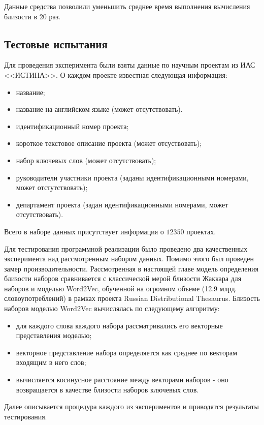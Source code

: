 Данные средства позволили уменьшить среднее время выполнения вычисления близости в 20 раз.

\subsection{Тестовые испытания}
Для проведения эксперимента были взяты данные по научным проектам из ИАС <<ИСТИНА>>. О каждом проекте известная следующая информация: 
\begin{itemize}
    \item название;
    \item название на английском языке (может отсутствовать).
    \item идентификационный номер проекта;
    \item короткое текстовое описание проекта (может отсуствовать);
    \item набор ключевых слов (может отсутствовать);
    \item руководители участники проекта (заданы идентификационными номерами, может отстутствовать);
    \item департамент проекта (задан идентификационными номерами, может отсутствовать).
\end{itemize}

Всего в наборе данных присутствует информация о $12350$ проектах. 

Для тестирования программной реализации было проведено два качественных эксперимента над рассмотренным набором данных. Помимо этого был проведен замер производительности. Рассмотренная в настоящей главе модель определения близости наборов сравнивается с классической мерой близости Жаккара для наборов и моделью Word2Vec, обученной на огромном объеме (12.9 млрд. словоупотреблений) в рамках проекта Russian Distributional Thesaurus. Близость наборов моделью Word2Vec вычислялась по следующему алгоритму:
\begin{itemize}
    \item для каждого слова каждого набора рассматривались его векторные представления моделью;
    \item векторное представление набора определяется как среднее по векторам входящим в него слов;
    \item вычисляется косинусное расстояние между векторами наборов - оно возвращается в качестве близости наборов ключевых слов.
\end{itemize}
        
Далее описывается процедура каждого из экспериментов и приводятся результаты тестирования. 

